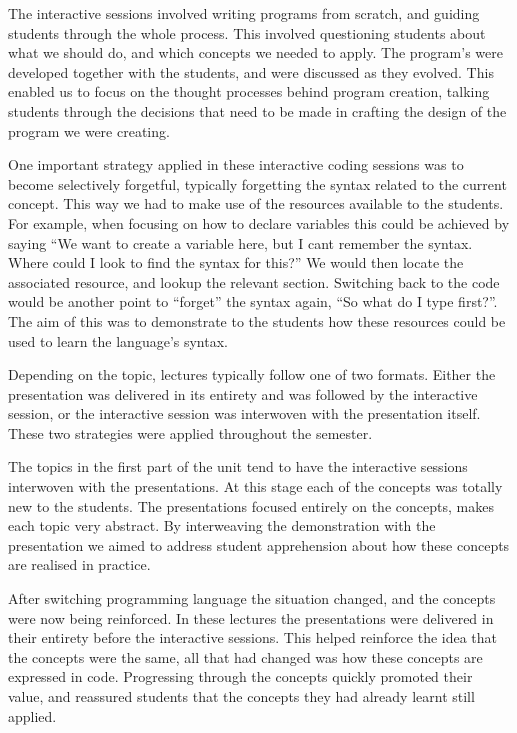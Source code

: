 The interactive sessions involved writing programs from scratch, and guiding students through the whole process. This involved questioning students about what we should do, and which concepts we needed to apply. The program's were developed together with the students, and were discussed as they evolved. This enabled us to focus on the thought processes behind program creation, talking students through the decisions that need to be made in crafting the design of the program we were creating.

One important strategy applied in these interactive coding sessions was to become selectively forgetful, typically forgetting the syntax related to the current concept. This way we had to make use of the resources available to the students. For example, when focusing on how to declare variables this could be achieved by saying ``We want to create a variable here, but I cant remember the syntax. Where could I look to find the syntax for this?'' We would then locate the associated resource, and lookup the relevant section. Switching back to the code would be another point to ``forget'' the syntax again, ``So what do I type first?''. The aim of this was to demonstrate to the students how these resources could be used to learn the language's syntax.

Depending on the topic, lectures typically follow one of two formats. Either the presentation was delivered in its entirety and was followed by the interactive session, or the interactive session was interwoven with the presentation itself. These two strategies were applied throughout the semester. 

The topics in the first part of the unit tend to have the interactive sessions interwoven with the presentations. At this stage each of the concepts was totally new to the students. The presentations focused entirely on the concepts, makes each topic very abstract. By interweaving the demonstration with the presentation we aimed to address student apprehension about how these concepts are realised in practice.

After switching programming language the situation changed, and the concepts were now being reinforced. In these lectures the presentations were delivered in their entirety before the interactive sessions. This helped reinforce the idea that the concepts were the same, all that had changed was how these concepts are expressed in code. Progressing through the concepts quickly promoted their value, and reassured students that the concepts they had already learnt still applied.

